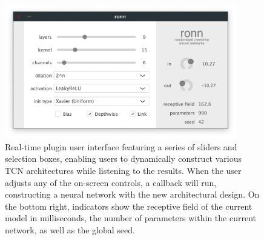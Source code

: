 \documentclass{article}
\begin{document}
\begin{figure}[h]
  \centering
  \includegraphics[width=0.9\textwidth]{ronn-vst-ui.png}  
  \caption{Real-time plugin user interface featuring a series of sliders and selection boxes, 
  enabling users to dynamically construct various TCN architectures while listening to the results.
  When the user adjusts any of the on-screen controls, a callback will run, 
  constructing a neural network with the new architectural design. 
  On the bottom right, indicators show the receptive field of the current model in milliseconds, 
  the number of parameters within the current network, as well as the global seed. 
  }
  \label{fig:ui}
\end{figure}
\end{document}
